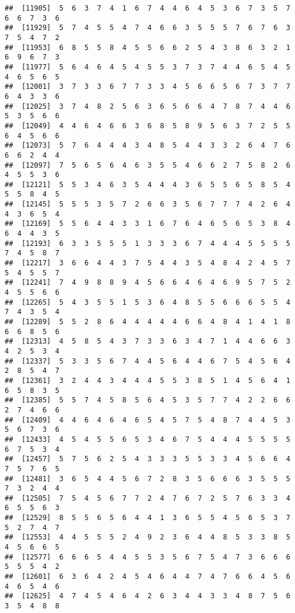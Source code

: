 \documentclass[
]{book}
\begin{document}
\begin{verbatim}
##  [11905]  5  6  3  7  4  1  6  7  4  4  6  4  5  3  6  7  3  5  7  6  6  7  3  6
##  [11929]  5  7  4  5  5  4  7  4  6  6  3  5  5  5  7  6  7  6  3  7  5  4  7  2
##  [11953]  6  8  5  5  8  4  5  5  6  6  2  5  4  3  8  6  3  2  1  6  9  6  7  3
##  [11977]  5  6  4  6  4  5  4  5  5  3  7  3  7  4  4  6  5  4  5  4  6  5  6  5
##  [12001]  3  7  3  3  6  7  7  3  3  4  5  6  6  5  6  7  3  7  7  6  4  3  3  6
##  [12025]  3  7  4  8  2  5  6  3  6  5  6  6  4  7  8  7  4  4  6  5  3  5  6  6
##  [12049]  4  4  6  4  6  6  3  6  8  5  8  9  5  6  3  7  2  5  5  6  4  5  6  6
##  [12073]  5  7  6  4  4  4  3  4  8  5  4  4  3  3  2  6  4  7  6  6  6  2  4  4
##  [12097]  7  5  6  5  6  4  6  3  5  5  4  6  6  2  7  5  8  2  6  4  5  5  3  6
##  [12121]  5  5  3  4  6  3  5  4  4  4  3  6  5  5  6  5  8  5  4  5  5  8  4  5
##  [12145]  5  5  5  3  5  7  2  6  6  3  5  6  7  7  7  4  2  6  4  4  3  6  5  4
##  [12169]  5  5  6  4  4  3  3  1  6  7  6  4  6  5  6  5  3  8  4  6  4  4  3  5
##  [12193]  6  3  3  5  5  5  1  3  3  3  6  7  4  4  4  5  5  5  5  7  4  5  8  7
##  [12217]  3  6  6  4  4  3  7  5  4  4  3  5  4  8  4  2  4  5  7  5  4  5  5  7
##  [12241]  7  4  9  8  8  9  4  5  6  6  4  6  4  6  9  5  7  5  2  4  5  5  6  6
##  [12265]  5  4  3  5  5  1  5  3  6  4  8  5  5  6  6  6  5  5  4  7  4  3  5  4
##  [12289]  5  5  2  8  6  4  4  4  4  4  6  6  4  8  4  1  4  1  8  6  6  8  5  6
##  [12313]  4  5  8  5  4  3  7  3  3  6  3  4  7  1  4  4  6  6  3  4  2  5  3  4
##  [12337]  5  3  3  5  6  7  4  4  5  6  4  4  6  7  5  4  5  6  4  2  8  5  4  7
##  [12361]  3  2  4  4  3  4  4  4  5  5  3  8  5  1  4  5  6  4  1  6  5  8  3  5
##  [12385]  5  5  7  4  5  8  5  6  4  5  3  5  7  7  4  2  2  6  6  2  7  4  6  6
##  [12409]  4  4  6  4  6  4  6  5  4  5  7  5  4  8  7  4  4  5  3  5  6  7  3  6
##  [12433]  4  5  4  5  5  6  5  3  4  6  7  5  4  4  4  5  5  5  5  6  7  5  3  4
##  [12457]  5  7  5  6  2  5  4  3  3  3  5  5  3  3  4  5  6  6  4  7  5  7  6  5
##  [12481]  3  6  5  4  4  5  6  7  2  8  3  5  6  6  6  3  5  5  5  7  3  2  4  4
##  [12505]  7  5  4  5  6  7  7  2  4  7  6  7  2  5  7  6  3  3  4  6  5  5  6  3
##  [12529]  8  5  5  6  5  6  4  4  1  3  6  5  5  4  5  6  5  3  7  5  2  7  4  7
##  [12553]  4  4  5  5  5  2  4  9  2  3  6  4  4  8  5  3  3  8  5  4  5  6  6  5
##  [12577]  6  6  6  5  4  4  5  5  3  5  6  7  5  4  7  3  6  6  6  5  5  5  4  2
##  [12601]  6  3  6  4  2  4  5  4  6  4  4  7  4  7  6  6  4  5  6  4  6  5  4  6
##  [12625]  4  7  4  5  4  6  4  2  6  3  4  4  3  3  4  8  7  5  6  3  5  4  8  8

\end{verbatim}
\end{document}
